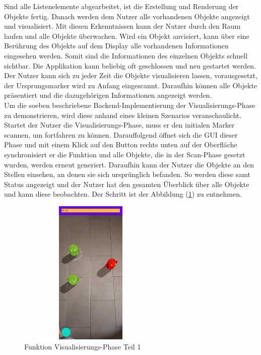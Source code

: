 Sind alle Listenelemente abgearbeitet, ist die Erstellung und Renderung der Objekte fertig. Danach werden dem Nutzer alle vorhandenen Objekte angezeigt und 
visualisiert. Mit diesen Erkenntnissen kann der Nutzer durch den Raum laufen und alle Objekte überwachen. Wird ein Objekt anvisiert, kann über eine Berührung 
des Objekts auf dem Display alle vorhandenen Informationen eingesehen werden. Somit sind die Informationen des einzelnen Objekts schnell sichtbar.  
Die Applikation kann beliebig oft geschlossen und neu gestartet werden. Der Nutzer kann sich zu jeder Zeit die Objekte visualisieren lassen, vorausgesetzt, der 
Ursprungsmarker wird zu Anfang eingescannt. Daraufhin können alle Objekte präsentiert und die dazugehörigen Informationen angezeigt werden. %
\\ 
\linebreak
Um die soeben beschriebene Backend-Implementierung der Visualisierungs-Phase zu demonstrieren, wird diese anhand eines kleinen Szenarios veranschaulicht. 
\\ 
Startet der Nutzer die Visualisierungs-Phase, muss er den initialen Marker scannen, um fortfahren zu können. Darauffolgend öffnet sich die \acs{GUI} dieser 
Phase und mit einem Klick auf den Button rechts unten auf der Oberfläche synchronisiert er die Funktion und alle Objekte, die in der Scan-Phase gesetzt wurden, 
werden erneut generiert. Daraufhin kann der Nutzer die Objekte an den Stellen einsehen, an denen sie sich ursprünglich befanden. So werden diese samt Status 
angezeigt und der Nutzer hat den gesamten Überblick über alle Objekte und kann diese beobachten. Der Schritt ist der Abbildung (\ref{pic:visual_objects}) 
zu entnehmen. 
\begin{figure}[hbt!]
    \centering
    \includegraphics[width=7cm,height=7cm,keepaspectratio]{4Umsetzung/Bilder/show_objects_after_loading.jpg}
    \caption{Funktion Visualisierungs-Phase Teil 1}
    \label{pic:visual_objects}
\end{figure}
